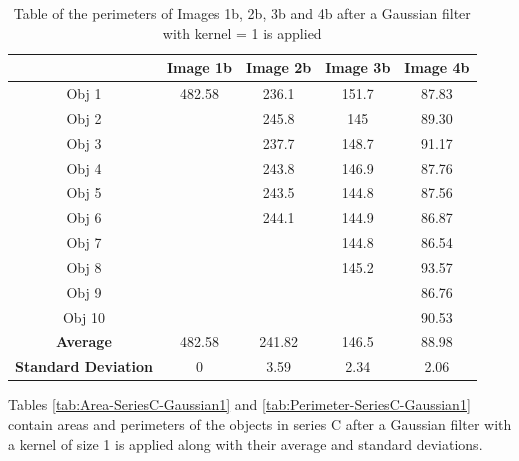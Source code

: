 \documentclass[runningheads]{llncs}
\begin{document}
\begin{table}[h!]
\centering
\begin{tabular}{|c|c|c|c|c|}
\hline
\textbf{} & \textbf{Image 1b} & \textbf{Image 2b} & \textbf{Image 3b} & \textbf{Image 4b} \\
\hline
Obj 1 & 482.58     & 236.1 & 151.7 &  87.83 \\ \hline
Obj 2 &            & 245.8  & 145 &  89.30\\ \hline
Obj 3 &            & 237.7  & 148.7 &  91.17\\ \hline
Obj 4 &            & 243.8  & 146.9 &  87.76\\ \hline
Obj 5 &            & 243.5  & 144.8 &  87.56\\ \hline
Obj 6 &            & 244.1  & 144.9 &  86.87\\ \hline
Obj 7 &            &       & 144.8 &  86.54\\ \hline
Obj 8 &            &       & 145.2 &  93.57 \\ \hline
Obj 9 &            &       &      &  86.76\\ \hline
Obj 10 &           &       &      &  90.53\\ \hline
\textbf{Average} &   482.58    &  241.82      &   146.5    & 88.98  \\ \hline
\textbf{Standard Deviation} &  0      &  3.59       &    2.34   & 2.06  \\ \hline
\end{tabular}
\caption{Table of the perimeters of Images 1b, 2b, 3b and 4b after a Gaussian filter with kernel = 1 is applied }
\label{tab:Perimeter-SeriesB-Gaussian1}
\end{table}

\newpage 
Tables \ref{tab:Area-SeriesC-Gaussian1} and \ref{tab:Perimeter-SeriesC-Gaussian1} contain areas and perimeters of the objects in series C after a Gaussian filter with a kernel of size 1 is applied along with their average and standard deviations.
\end{document}
